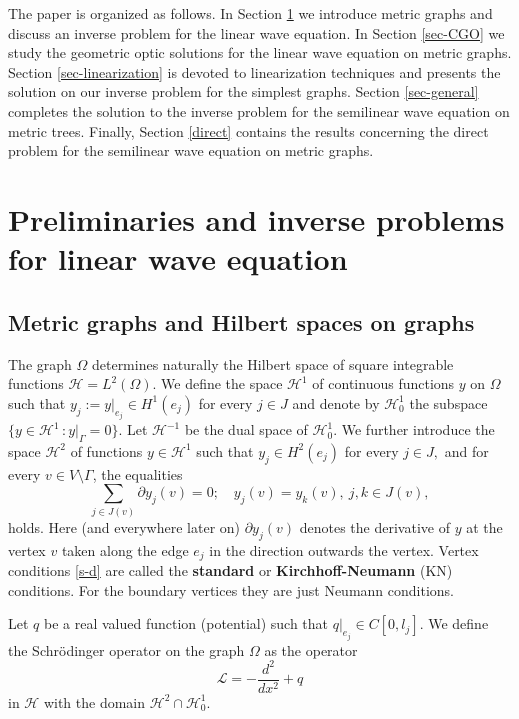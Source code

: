 \documentclass[11pt]{amsart}
\theoremstyle{definition}
\theoremstyle{plain}
\numberwithin{equation}{section}
\newcommand\Om{\Omega}
\begin{document}
\smallskip
 The paper is organized as follows. In Section \ref{prel} we introduce metric graphs and discuss an inverse problem for the linear wave equation.
In Section \ref{sec-CGO} we study the geometric optic solutions for the linear wave equation on metric graphs. Section \ref{sec-linearization} is devoted to linearization techniques and presents the solution on our inverse problem for the simplest graphs. Section \ref{sec-general} completes the solution to the inverse problem for the semilinear wave equation on metric trees. 
Finally, Section \ref{direct} contains the results concerning the direct problem for the semilinear wave equation on metric graphs.




\section{Preliminaries and inverse problems for linear wave equation} \label{prel}
\subsection{Metric graphs and Hilbert spaces on graphs}


The graph $ \Omega $ determines naturally the Hilbert space of square
integrable functions $ \mathcal{H}=L^2 (\Omega). $ We define the space  $\mathcal{H}^1$
of  continuous functions $y$ on $\Omega$ such that
$y_j:=y|_{e_j} \in H^1(e_j)$ for every $j \in J$ and denote by  $\mathcal{H}^1_0$ the subspace $\{y \in  \mathcal{H}^1 \,: y|_{\Gamma}=0\}.$ 
Let $\mathcal{H}^{-1}$ be the dual space of $\mathcal{H}^1_0$.
We further introduce the space $ \mathcal{H}^2$ of functions $y \in \mathcal{H}^1$  such that
$y_j \in H^2(e_j)$ for every $j \in J,$ and
for every $v \in V \setminus \Gamma$, the equalities
\begin{equation}\label{s-d}
\sum_{j \in J(v)} \partial y_j(v)=0; \quad y_j(v)=y_k(v), \ j,k \in J(v),
\end{equation}
holds. Here (and everywhere later on)
$\partial y_j(v)$ denotes the
derivative of $y$ at the vertex $v$ taken along the  edge  $e_{j}$
in the direction outwards the vertex.
Vertex conditions \eqref{s-d}  are called the {\bf standard}
or {\bf Kirchhoff-Neumann} (KN) conditions. For the boundary vertices they are just Neumann conditions. 


Let $q$ be a real valued function (potential) such that $q|_{e_j} \in C[0,l_j]$. We define the Schr\"odinger operator on the graph $\Om$ as the operator 
\begin{equation} \label{sch}
\, \mathcal{L}  = - \frac{d^2}{dx^2} + q \,
\end{equation}
in $ \mathcal{H} $ with the domain $\mathcal{H}^2 \cap \mathcal{H}^1_0.$
\end{document}
